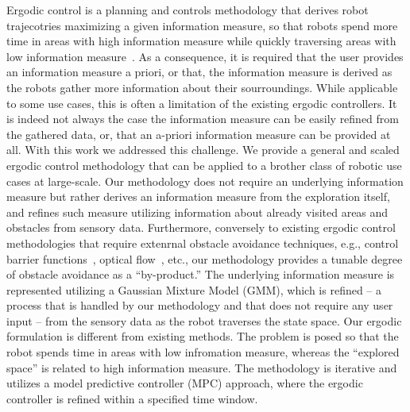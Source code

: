 \documentclass[letterpaper,10pt,conference,twoside]{IEEEtran}
\theoremstyle{definition}
\begin{document}
Ergodic control is a planning and controls methodology that derives robot trajecotries maximizing a given information measure, so that robots spend more time in areas with high information measure while quickly traversing areas with low information measure~\cite{mathew2011metrics,abraham2017ergodic,miller2013trajectory}. As a consequence, it is required that the user provides an information measure a priori, or that, the information measure is derived as the robots gather more information about their sourroundings. 
While applicable to some use cases, this is often a limitation of the existing ergodic controllers. It is indeed not always the case the information measure can be easily refined from the gathered data, or, that an a-priori information measure can be provided at all. With this work we addressed this challenge. We provide a general and scaled ergodic control methodology that can be applied to a brother class of robotic use cases at large-scale. Our methodology does not require an underlying information measure but rather derives an information measure from the exploration itself, and refines such measure utilizing information about already visited areas and obstacles from sensory data. 
Furthermore, conversely to existing ergodic control methodologies that require extenrnal obstacle avoidance techniques, e.g., control barrier functions~\cite{lerch2023safety}, optical flow~\cite{prabhakar2020ergodic}, etc., our methodology provides a tunable degree of obstacle avoidance as a ``by-product.'' 
%
The underlying information measure is represented utilizing a Gaussian Mixture Model (GMM), which is refined -- a process that is handled by our methodology and that does not require any user input -- from the sensory data as the robot traverses the state space. Our ergodic formulation is different from existing methods. The problem is posed so that the robot spends time in areas with low infromation measure, whereas the ``explored space'' is related to high information measure. 
The methodology is iterative and utilizes a model predictive controller (MPC) approach, where the ergodic controller is refined within a specified time window. 
\end{document}

